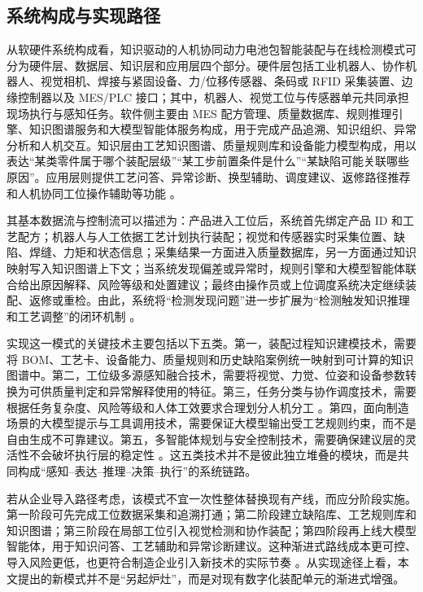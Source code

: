 \subsection{系统构成与实现路径}
从软硬件系统构成看，知识驱动的人机协同动力电池包智能装配与在线检测模式可分为硬件层、数据层、知识层和应用层四个部分。硬件层包括工业机器人、协作机器人、视觉相机、焊接与紧固设备、力/位移传感器、条码或 RFID 采集装置、边缘控制器以及 MES/PLC 接口；其中，机器人、视觉工位与传感器单元共同承担现场执行与感知任务。软件侧主要由 MES 配方管理、质量数据库、规则推理引擎、知识图谱服务和大模型智能体服务构成，用于完成产品追溯、知识组织、异常分析和人机交互。知识层由工艺知识图谱、质量规则库和设备能力模型构成，用以表达“某类零件属于哪个装配层级”“某工步前置条件是什么”“某缺陷可能关联哪些原因”。应用层则提供工艺问答、异常诊断、换型辅助、调度建议、返修路径推荐和人机协同工位操作辅助等功能 \cite{Sahota2025JIM,Elbasheer2025JIM,Zhang2023JMSYKG,Yao2023JMSY,Long2025IJPR}。

其基本数据流与控制流可以描述为：产品进入工位后，系统首先绑定产品 ID 和工艺配方；机器人与人工依据工艺计划执行装配；视觉和传感器实时采集位置、缺陷、焊缝、力矩和状态信息；采集结果一方面进入质量数据库，另一方面通过知识映射写入知识图谱上下文；当系统发现偏差或异常时，规则引擎和大模型智能体联合给出原因解释、风险等级和处置建议；最终由操作员或上位调度系统决定继续装配、返修或重检。由此，系统将“检测发现问题”进一步扩展为“检测触发知识推理和工艺调整”的闭环机制 \cite{Sgarbossa2024JMSY,Ji2024SciRep}。

实现这一模式的关键技术主要包括以下五类。第一，装配过程知识建模技术，需要将 BOM、工艺卡、设备能力、质量规则和历史缺陷案例统一映射到可计算的知识图谱中。第二，工位级多源感知融合技术，需要将视觉、力觉、位姿和设备参数转换为可供质量判定和异常解释使用的特征。第三，任务分类与协作调度技术，需要根据任务复杂度、风险等级和人体工效要求合理划分人机分工 \cite{Faccio2021IJAMT,Alessio2024JIM,Banziger2023RCIM}。第四，面向制造场景的大模型提示与工具调用技术，需要保证大模型输出受工艺规则约束，而不是自由生成不可靠建议。第五，多智能体规划与安全控制技术，需要确保建议层的灵活性不会破坏执行层的稳定性 \cite{Massouh2025JIM,Pulikottil2023IJAMT,Abelha2020RAL}。这五类技术并不是彼此独立堆叠的模块，而是共同构成“感知--表达--推理--决策--执行”的系统链路。

若从企业导入路径考虑，该模式不宜一次性整体替换现有产线，而应分阶段实施。第一阶段可先完成工位数据采集和追溯打通；第二阶段建立缺陷库、工艺规则库和知识图谱；第三阶段在局部工位引入视觉检测和协作装配；第四阶段再上线大模型智能体，用于知识问答、工艺辅助和异常诊断建议。这种渐进式路线成本更可控、导入风险更低，也更符合制造企业引入新技术的实际节奏 \cite{Ayerbe2021AEM,Tao2020Sustainability}。从实现途径上看，本文提出的新模式并不是“另起炉灶”，而是对现有数字化装配单元的渐进式增强。

